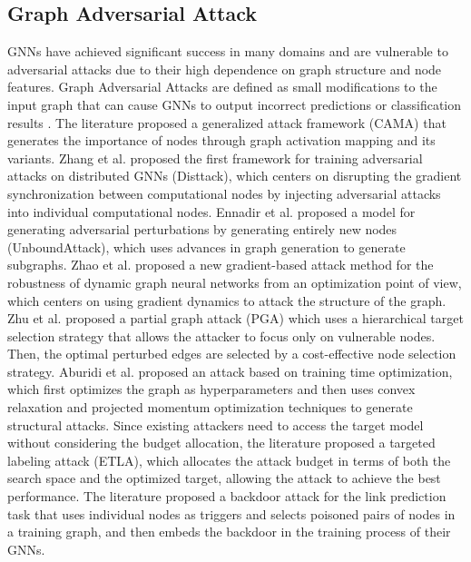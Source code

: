 \subsection{Graph Adversarial Attack}\label{2.3}

GNNs have achieved significant success in many domains and are vulnerable to adversarial attacks due to their high dependence on graph structure and node features. Graph Adversarial Attacks are defined as small modifications to the input graph that can cause GNNs to output incorrect predictions or classification results \cite{WOS:001293902200001}.
The literature \cite{DBLP:journals/tkde/WangCXBZWZZ24} proposed a generalized attack framework (CAMA) that generates the importance of nodes through graph activation mapping and its variants.
Zhang et al. \cite{DBLP:conf/europar/ZhangLWYYYF24} proposed the first framework for training adversarial attacks on distributed GNNs (Disttack), which centers on disrupting the gradient synchronization between computational nodes by injecting adversarial attacks into individual computational nodes. Ennadir et al. \cite{DBLP:conf/complexnetworks/EnnadirANVB23} proposed a model for generating adversarial perturbations by generating entirely new nodes (UnboundAttack), which uses advances in graph generation to generate subgraphs. Zhao et al. \cite{DBLP:journals/tkde/ZhaoYYXZLLC24} proposed a new gradient-based attack method for the robustness of dynamic graph neural networks from an optimization point of view, which centers on using gradient dynamics to attack the structure of the graph. Zhu et al. \cite{DBLP:journals/corr/abs-2308-07834} proposed a partial graph attack (PGA) which uses a hierarchical target selection strategy that allows the attacker to focus only on vulnerable nodes. Then, the optimal perturbed edges are selected by a cost-effective node selection strategy. Aburidi et al. \cite{DBLP:conf/eais/AburidiM24} proposed an attack based on training time optimization, which first optimizes the graph as hyperparameters and then uses convex relaxation and projected momentum optimization techniques to generate structural attacks. Since existing attackers need to access the target model without considering the budget allocation, the literature \cite{DBLP:journals/kbs/CaoCY24} proposed a targeted labeling attack (ETLA), which allocates the attack budget in terms of both the search space and the optimized target, allowing the attack to achieve the best performance. The literature \cite{DBLP:journals/corr/abs-2401-02663} proposed a backdoor attack for the link prediction task that uses individual nodes as triggers and selects poisoned pairs of nodes in a training graph, and then embeds the backdoor in the training process of their GNNs.